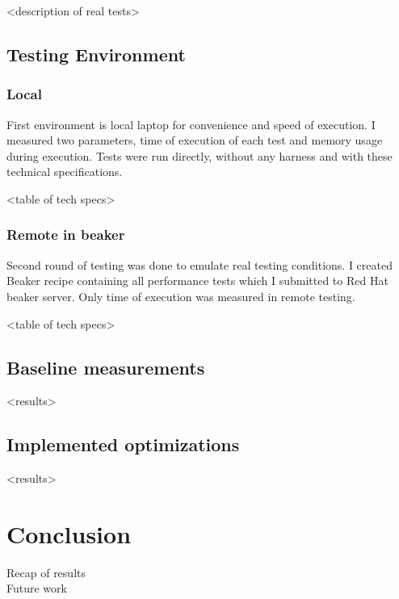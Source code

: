<description of real tests>

\section{Testing Environment}

\subsection{Local}
First environment is local laptop for convenience and speed of execution. I measured  two parameters, time of execution of each test and memory usage during execution. Tests were run directly, without any harness and with these technical specifications. 

<table of tech specs>

\subsection{Remote in beaker}
Second round of testing was done to emulate real testing conditions. I created Beaker recipe containing all performance tests which I submitted to Red Hat beaker server. Only time of execution was measured in remote testing.

<table of tech specs>

\section{Baseline measurements}
<results>


\section{Implemented optimizations}
<results>

\chapter{Conclusion}
Recap of results
\\
Future work

